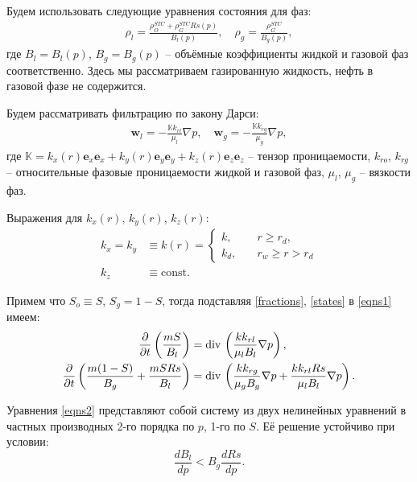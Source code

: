 	Будем использовать следующие уравнения состояния для фаз:
\begin{align}
	\label{states}
	\rho_{l} = \frac{\rho_O^{STC} + \rho_G^{STC}Rs(p)}{B_l(p)}, \quad \rho_{g} = \frac{\rho_G^{STC}}{B_g(p)},
\end{align}
	где $B_l = B_l(p)$, $B_g = B_g(p)$  -- объёмные коэффициенты жидкой и газовой фаз соответственно.
	Здесь мы рассматриваем газированную жидкость, нефть в газовой фазе не содержится.
	
	Будем рассматривать фильтрацию по закону Дарси:
\begin{align}
	\label{vel}
	\boldsymbol{w}_l = -\frac{\mathbb{K}k_{rl}}{\mu_l}\nabla p, \quad
	\boldsymbol{w}_g = -\frac{\mathbb{K}k_{rg}}{\mu_g}\nabla p, 
\end{align}
	где $\mathbb{K} = k_x(r)\boldsymbol{e}_x\boldsymbol{e}_x + k_y(r)\boldsymbol{e}_y\boldsymbol{e}_y+ k_z(r)\boldsymbol{e}_z\boldsymbol{e}_z$ -- тензор проницаемости,
	$k_{ro}$, $k_{rg}$ -- относительные фазовые проницаемости жидкой и газовой фаз,
	$\mu_l$, $\mu_g$ -- вязкости фаз.
	
	Выражения для $k_x(r)$, $k_y(r)$, $k_z(r)$:
\begin{align}
	\label{perms}
	k_x = k_y &\equiv k(r) = 
	\begin{cases}
		k, &\quad r\geq r_d,\\
		k_d, &\quad r_w\geq r > r_d
	\end{cases}\\
	k_z &\equiv \text{const}.
\end{align}

	Примем что $S_o \equiv S$, $S_g = 1 - S$, тогда подставляя \eqref{fractions}, \eqref{states} в \eqref{eqns1} имеем:
\begin{align}
	\label{eqns2}
	\frac{\partial}{\partial{t}}\left(\frac{mS}{B_l}\right)&=
	{\rm div}\,\left(\frac{kk_{rl}}{\mu_l B_l}\nabla p\right),\nonumber\\
	\frac{\partial}{\partial{t}}\left(\frac{m(1-S)}{B_g}+\frac{mSRs}{B_l}\right)&=
	{\rm div}\,\left(\frac{kk_{rg}}{\mu_g B_g}\nabla p+\frac{kk_{rl}Rs}{\mu_l B_l}\nabla p\right).
\end{align}
	
	Уравнения \eqref{eqns2} представляют собой систему из двух нелинейных уравнений в частных производных 2-го порядка по $p$, 1-го по $S$. Её решение устойчиво при условии:
\begin{equation}
	\label{stab_cond}
	\frac{dB_l}{dp} < B_g\frac{dRs}{dp}.
\end{equation}
	
